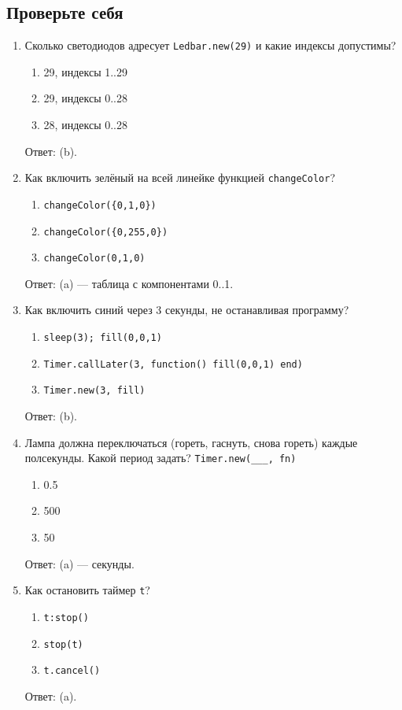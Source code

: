 \subsection{Проверьте себя}
\begin{enumerate}
\item Сколько светодиодов адресует \verb|Ledbar.new(29)| и какие индексы допустимы?
  \begin{enumerate}[label=(\alph*)] \item 29, индексы 1..29 \item 29, индексы 0..28 \item 28, индексы 0..28 \end{enumerate}
  Ответ: (b).
\item Как включить зелёный на всей линейке функцией \verb|changeColor|?
  \begin{enumerate}[label=(\alph*)] \item \verb|changeColor({0,1,0})| \item \verb|changeColor({0,255,0})| \item \verb|changeColor(0,1,0)| \end{enumerate}
  Ответ: (a) --- таблица с компонентами 0..1.
\item Как включить синий через 3 секунды, не останавливая программу?
  \begin{enumerate}[label=(\alph*)] \item \verb|sleep(3); fill(0,0,1)| \item \texttt{Timer.callLater(3, function() fill(0,0,1) end)} \item \verb|Timer.new(3, fill)| \end{enumerate}
  Ответ: (b).
\item Лампа должна переключаться (гореть, гаснуть, снова гореть) каждые полсекунды. Какой период задать? \verb|Timer.new(___, fn)|
  \begin{enumerate}[label=(\alph*)] \item 0.5 \item 500 \item 50 \end{enumerate}
  Ответ: (a) --- секунды.
\item Как остановить таймер \verb|t|?
  \begin{enumerate}[label=(\alph*)] \item \verb|t:stop()| \item \verb|stop(t)| \item \verb|t.cancel()| \end{enumerate}
  Ответ: (a).

\end{enumerate}
